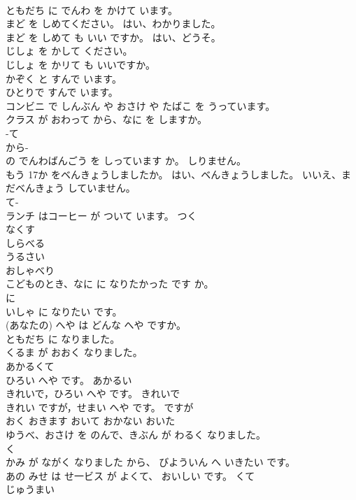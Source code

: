 \documentclass[8pt]{extreport}
\begin{document}
\begin{CJK}{UTF8}{min}
\\	ともだち に でんわ を かけて います。	
\\	まど を しめてください。 はい、わかりました。	
\\	まど を しめて も いい ですか。 はい、どうそ。	
\\	じしょ を かして ください。	
\\	じしょ を かリて も いいですか。	
\\	かぞく と すんで います。	
\\	ひとりで すんで います。	
\\	コンビニ で しんぶん や おさけ や たばこ を うっています。	
\\	クラス が おわって から、なに を しますか。	
\\	-て 
\\	から- 
\\	の でんわばんごう を しっています か。 しりません。	
\\	もう 17か をベんきょうしましたか。 はい、ベんきょうしました。 いいえ、まだベんきょう していません。	
\\	て-
\\	ランチ はコーヒー が ついて います。	つく
\\	なくす	
\\	しらべる	
\\	うるさい	
\\	おしゃべり	
\\	こどものとき、なに に なりたかった です か。	
\\	に 
\\	いしゃ に なりたい です。	
\\	(あなたの) へや は どんな へや ですか。	
\\	ともだち に なりました。	
\\	くるま が おおく なりました。	
\\	あかるくて 
\\	ひろい へや です。	あかるい 
\\	きれいで，ひろい へや です。	きれいで 
\\	きれい ですが，せまい へや です。	ですが 
\\	おく	おきます	おいて	おかない	おいた	
\\	ゆうべ、おさけ を のんで、きぶん が わるく なりました。	
\\	く
\\	かみ が ながく なりました から、 びよういん へ いきたい です。	
\\	あの みせ は せ一ビス が よくて、 おいしい です。	くて 
\\	じゅうまい	

\end{CJK}
\end{document}

